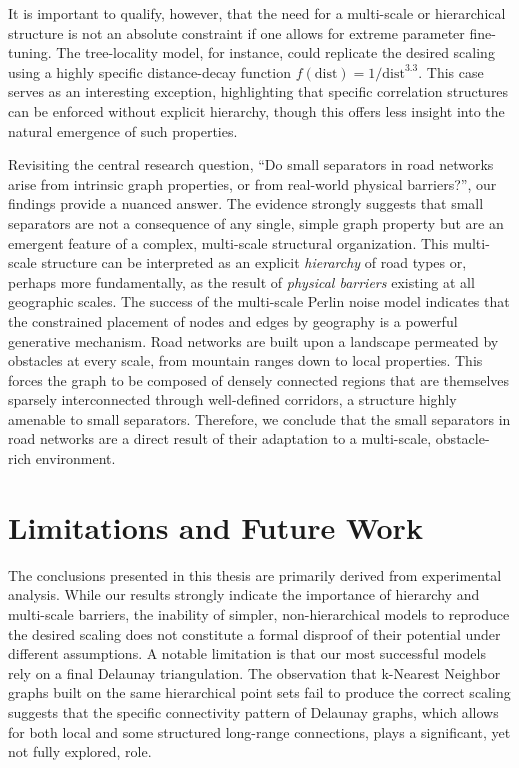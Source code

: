 It is important to qualify, however, that the need for a multi-scale or hierarchical structure is not an absolute constraint if one allows for extreme parameter fine-tuning.
The tree-locality model, for instance, could replicate the desired scaling using a highly specific distance-decay function \(f(\text{dist}) = 1/\text{dist}^{3.3}\).
This case serves as an interesting exception, highlighting that specific correlation structures can be enforced without explicit hierarchy, though this offers less insight into the natural emergence of such properties.

Revisiting the central research question, \enquote{Do small separators in road networks arise from intrinsic graph properties, or from real-world physical barriers?}, our findings provide a nuanced answer.
The evidence strongly suggests that small separators are not a consequence of any single, simple graph property but are an emergent feature of a complex, multi-scale structural organization.
This multi-scale structure can be interpreted as an explicit \emph{hierarchy} of road types or, perhaps more fundamentally, as the result of \emph{physical barriers} existing at all geographic scales.
The success of the multi-scale Perlin noise model indicates that the constrained placement of nodes and edges by geography is a powerful generative mechanism.
Road networks are built upon a landscape permeated by obstacles at every scale, from mountain ranges down to local properties.
This forces the graph to be composed of densely connected regions that are themselves sparsely interconnected through well-defined corridors, a structure highly amenable to small separators.
Therefore, we conclude that the small separators in road networks are a direct result of their adaptation to a multi-scale, obstacle-rich environment.

\section{Limitations and Future Work}
\label{sec:conclusion:future_work}

The conclusions presented in this thesis are primarily derived from experimental analysis.
While our results strongly indicate the importance of hierarchy and multi-scale barriers, the inability of simpler, non-hierarchical models to reproduce the desired scaling does not constitute a formal disproof of their potential under different assumptions.
A notable limitation is that our most successful models rely on a final Delaunay triangulation.
The observation that k-Nearest Neighbor graphs built on the same hierarchical point sets fail to produce the correct scaling suggests that the specific connectivity pattern of Delaunay graphs, which allows for both local and some structured long-range connections, plays a significant, yet not fully explored, role.

